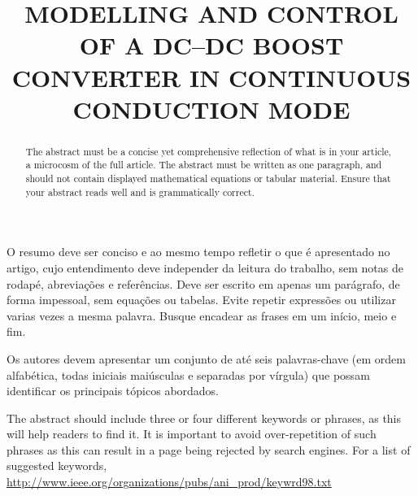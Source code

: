 \title{MODELLING AND CONTROL OF A DC--DC BOOST CONVERTER IN CONTINUOUS CONDUCTION MODE} %

\maketitle




\begin{resumo}  O resumo deve ser conciso e ao mesmo tempo refletir o que é apresentado no artigo, cujo entendimento deve independer da leitura do trabalho, sem notas de rodapé, abreviações e referências. Deve ser escrito em apenas um parágrafo, de forma impessoal, sem equações ou tabelas. Evite repetir expressões ou utilizar varias vezes a mesma palavra. Busque encadear as frases em um início, meio e fim.
\end{resumo}

\begin{palavraschave }
		Os autores devem apresentar um conjunto de até seis palavras-chave (em ordem alfabética, todas iniciais maiúsculas e separadas por vírgula) que possam identificar os principais tópicos abordados.	
\end{palavraschave }

\englishtitle

\begin{abstract}
	The abstract must be a concise yet comprehensive reflection of what is in your article, a microcosm of the full article. The abstract must be written as one paragraph, and should not contain displayed mathematical equations or tabular material.  Ensure that your abstract reads well and is grammatically correct.
\end{abstract}

\begin{keywords}
	The abstract should include three or four different keywords or phrases, as this will help readers to find it. It is important to avoid over-repetition of such phrases as this can result in a page being rejected by search engines. For a list of suggested keywords, \url{http://www.ieee.org/organizations/pubs/ani_prod/keywrd98.txt}
\end{keywords}

